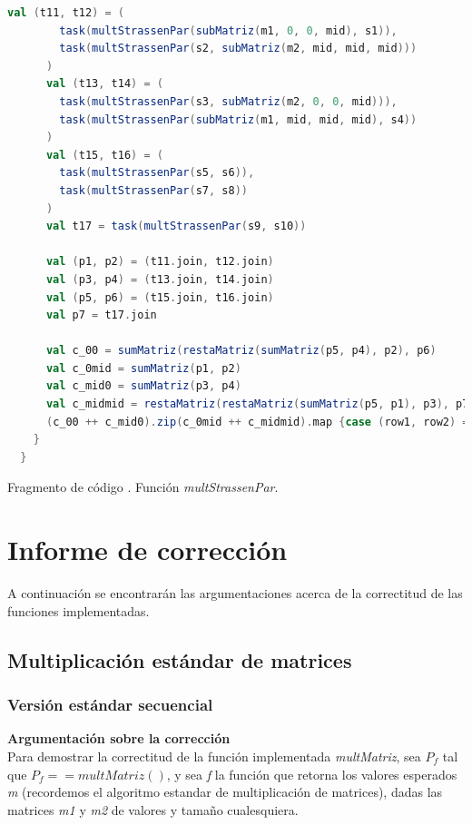 \documentclass{article}
\newcounter{codesnippet}
\begin{document}
\begin{lstlisting}[language=Scala]
      val (t11, t12) = (
        task(multStrassenPar(subMatriz(m1, 0, 0, mid), s1)),
        task(multStrassenPar(s2, subMatriz(m2, mid, mid, mid)))
      )
      val (t13, t14) = (
        task(multStrassenPar(s3, subMatriz(m2, 0, 0, mid))),
        task(multStrassenPar(subMatriz(m1, mid, mid, mid), s4))
      )
      val (t15, t16) = (
        task(multStrassenPar(s5, s6)),
        task(multStrassenPar(s7, s8))
      )
      val t17 = task(multStrassenPar(s9, s10))

      val (p1, p2) = (t11.join, t12.join)
      val (p3, p4) = (t13.join, t14.join)
      val (p5, p6) = (t15.join, t16.join)
      val p7 = t17.join

      val c_00 = sumMatriz(restaMatriz(sumMatriz(p5, p4), p2), p6)
      val c_0mid = sumMatriz(p1, p2)
      val c_mid0 = sumMatriz(p3, p4)
      val c_midmid = restaMatriz(restaMatriz(sumMatriz(p5, p1), p3), p7)
      (c_00 ++ c_mid0).zip(c_0mid ++ c_midmid).map {case (row1, row2) => row1 ++ row2}
    }
  }
\end{lstlisting}
\begin{center}
    \small{Fragmento de código \thecodesnippet. Función \textit{multStrassenPar}.}
\end{center}

\section{Informe de corrección}

A continuación se encontrarán las argumentaciones acerca de la correctitud de las funciones implementadas.

\subsection{Multiplicación estándar de matrices}
\subsubsection{Versión estándar secuencial}
\textbf{Argumentación sobre la corrección}\\

Para demostrar la correctitud de la función implementada \textit{multMatriz}, sea \(P_f\) tal que \(P_f == multMatriz()\), y sea \textit{f} la función que retorna los valores esperados \textit{m} (recordemos el algoritmo estandar de multiplicación de matrices), dadas las matrices \textit{m1} y \textit{m2} de valores y tamaño cualesquiera.\\
\end{document}
